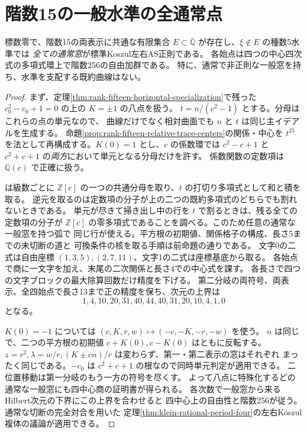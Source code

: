 \section{階数15の一般水準の全通常点}
\label{sec:rank-fifteen-generic-levels}
\begin{theorem}\label{thm:rank-fifteen-generic-levels}
標数零で、階数15の両表示に共通な有限集合
$E\subset\overline{\mathbb Q}$ が存在し、$\xi\notin E$ の種数5水準では
\emph{全ての通常窓}が標準Koszul左右AS正則である。
各始点は四つの中心四次式の多項式環上で階数256の自由加群である。
特に、通常で非正則な一般窓を持ち、水準を支配する既約曲線はない。
\end{theorem}
\begin{proof}
まず、定理\ref{thm:rank-fifteen-horizontal-specialization}で残った
$c_0^2-c_0+1=0$ の上の $K=\pm1$ の八点を扱う。
$t=n/(c^2-1)$ とする。分母はこれらの点の単元なので、
曲線だけでなく相対曲面でも $n$ と $t$ は同じ主イデアルを生成する。
命題\ref{prop:rank-fifteen-relative-trace-centers}の関係・中心を
$t^{25}$ を法として再構成する。$K(0)=1$ とし、$c$ の係数環では
$c^2-c+1$ と $c^2+c+1$ の\emph{両方}において単元となる分母だけを許す。
係数関数の定数項は $\mathbb Q(c)$ で正確に扱う。

 は級数ごとに
$\mathbb Z[c]$ の一つの共通分母を取り、$t$ の打切り多項式として和と積を取る。
逆元を取るのは定数項の分子が上の二つの既約多項式のどちらでも割れないときである。
単元が尽きて掃き出し中の行を $t$ で割るときは、残る全ての定数項の分子が
$\mathbb Z[c]$ の零多項式であることを調べる。このため任意の通常な一般窓を持つ弧で
同じ行が使える。平方根の初期値、関係格子の構成、長さ5までの未切断の道と
可換条件の核を取る手順は前命題の通りである。
文字0の二式は自由座標 $(1,3,5),(2,7,11)$、文字1の二式は座標基底から取る。
各始点で商に一文字を加え、末尾の二次関係と長さ4での中心式を課す。
各長さで四つの文字ブロックの最大除算回数だけ精度を下げる。
第二分岐の両符号、両表示、全四始点で長さ13まで正の精度を保ち、次元の上界は
\[
 1,4,10,20,31,40,44,40,31,20,10,4,1,0
\]
となる。

$K(0)=-1$ については $(c,K,r,w)\mapsto(-c,-K,-r,-w)$ を使う。
$n$ は同じで、二つの平方根の初期値 $c+K(0),c-K(0)$ はともに反転する。
$z=r^2,\lambda=w/r,(K\pm cn)/r$ は変わらず、第一・第二表示の窓はそれぞれ
まったく同じである。$-c_0$ は $c^2+c+1$ の根なので同時単元判定が適用できる。
二位置移動は第一分岐のもう一方の符号を尽くす。
よって八点に特殊化するどの通常な一般窓にも四中心商の証明書が得られる。
各次数で一般窓から来るHilbert次元の下界にこの上界を合わせると
四中心上の自由性と階数256が従う。通常な切断の完全対合を用いた
定理\ref{thm:klein-rational-period-four}の左右Koszul複体の議論が適用できる。


\end{proof}
